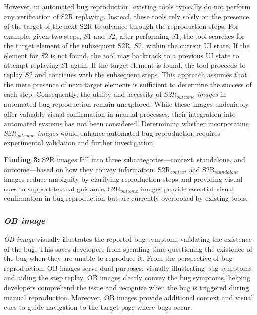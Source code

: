 However, in automated bug reproduction, existing tools typically do not perform any verification of S2R replaying.  Instead, these tools rely solely on the presence of the target of the next S2R to advance through the reproduction steps. For example, given two steps, $S1$ and $S2$, after performing $S1$, the tool searches for the target element of the subsequent S2R, $S2$, within the current UI state. If the element for $S2$ is not found, the tool may backtrack to a previous UI state to attempt replaying $S1$ again. If the target element is found, the tool proceeds to replay $S2$ and continues with the subsequent steps.
%
This approach assumes that the mere presence of next target elements is sufficient to determine the success of each step. Consequently, the utility and necessity of \textit{S2R$_{outcome}$ images}  in automated bug reproduction remain unexplored. While these images undeniably offer valuable visual confirmation in manual processes, their integration into automated systems has not been considered. Determining whether incorporating \textit{S2R$_{outcome}$ images} would enhance automated bug reproduction requires experimental validation and further investigation. 
\begin{tcolorbox}[colback=blue!5, colframe=black, boxrule=0.5pt]
\textbf{Finding 3:} 
%
S2R images fall into three subcategories—context, standalone, and outcome—based on how they convey information. S2R$_{context}$ and S2R$_{standalone}$ images reduce ambiguity by clarifying reproduction steps and providing visual cues to support textual guidance. 
S2R$_{outcome}$ images provide essential visual confirmation in bug reproduction but are currently overlooked by existing tools.
\end{tcolorbox}


\subsubsection{
\textbf{\textit{OB image}}} 
\textit{OB image} visually illustrates the reported bug symptom,  validating the existence of the bug. This saves developers from spending time questioning the existence of the bug when they are unable to reproduce it.
%
From the perspective of bug reproduction, OB images serve dual purposes: visually illustrating bug symptoms and aiding the step replay. OB images clearly convey the bug symptoms, helping developers comprehend the issue and recognize when the bug is triggered during manual reproduction. Moreover, OB images provide additional context and visual cues to guide navigation to the target page where bugs occur. 


